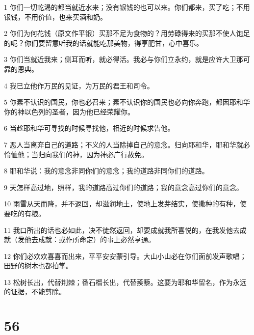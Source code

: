 \par 1 你们一切乾渴的都当就近水来；没有银钱的也可以来。你们都来，买了吃；不用银钱，不用价值，也来买酒和奶。
\par 2 你们为何花钱（原文作平银）买那不足为食物的？用劳碌得来的买那不使人饱足的呢？你们要留意听我的话就能吃那美物，得享肥甘，心中喜乐。
\par 3 你们当就近我来；侧耳而听，就必得活。我必与你们立永约，就是应许大卫那可靠的恩典。
\par 4 我已立他作万民的见证，为万民的君王和司令。
\par 5 你素不认识的国民，你也必召来；素不认识你的国民也必向你奔跑，都因耶和华你的神以色列的圣者，因为他已经荣耀你。
\par 6 当趁耶和华可寻找的时候寻找他，相近的时候求告他。
\par 7 恶人当离弃自己的道路；不义的人当除掉自己的意念。归向耶和华，耶和华就必怜恤他；当归向我们的神，因为神必广行赦免。
\par 8 耶和华说：我的意念非同你们的意念；我的道路非同你们的道路。
\par 9 天怎样高过地，照样，我的道路高过你们的道路；我的意念高过你们的意念。
\par 10 雨雪从天而降，并不返回，却滋润地土，使地上发芽结实，使撒种的有种，使要吃的有粮。
\par 11 我口所出的话也必如此，决不徒然返回，却要成就我所喜悦的，在我发他去成就（发他去成就：或作所命定）的事上必然亨通。
\par 12 你们必欢欢喜喜而出来，平平安安蒙引导。大山小山必在你们面前发声歌唱；田野的树木也都拍掌。
\par 13 松树长出，代替荆棘；番石榴长出，代替蒺藜。这要为耶和华留名，作为永远的证据，不能剪除。

\chapter{56}

